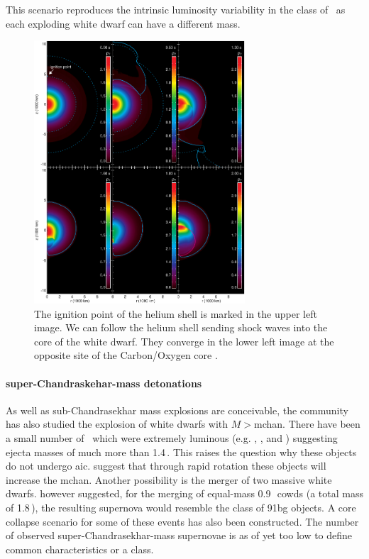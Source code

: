This scenario reproduces the intrinsic luminosity variability in the class of \snia\ as each exploding white dwarf can have a different mass. 

\begin{figure}[htbp] %
   \centering
   \includegraphics[width=0.7\textwidth]{chapter_intro/plots/fink2010.pdf} 
   \caption{The ignition point of the helium shell is marked in the upper left image. We can follow the helium shell sending shock waves into the core of the white dwarf. They converge in the lower left image at the opposite site of the Carbon/Oxygen core \citep[data from][Figure kindly provided by Michael Fink]{2010A&A...514A..53F}. }
   \label{fig:subch_fink2010}
\end{figure}

\paragraph{super-Chandraskehar-mass detonations}
As well as sub-Chandrasekhar mass explosions are conceivable, the community has also studied the explosion of white dwarfs with $M>$\gls{mchan}. There have been a small number of \sneia\ which were extremely luminous (e.g. , ,  and ) suggesting ejecta masses of much more than 1.4\,\msun. This raises the question why these objects do not undergo \gls{aic}.  \cite{2005A&A...435..967Y} suggest that through rapid rotation these objects will increase the \gls{mchan}. Another possibility is the merger of two massive white dwarfs. \citet{2010Natur.463...61P} however suggested, for the merging of equal-mass 0.9\,\msun\ \glspl{cowd} (a total mass of 1.8\,\msun), the resulting supernova would resemble the class of \gls{91bg} objects. A core collapse scenario for some of these events has also been constructed. The number of observed super-Chandrasekhar-mass supernovae is as of yet too low to define common characteristics or a class.


